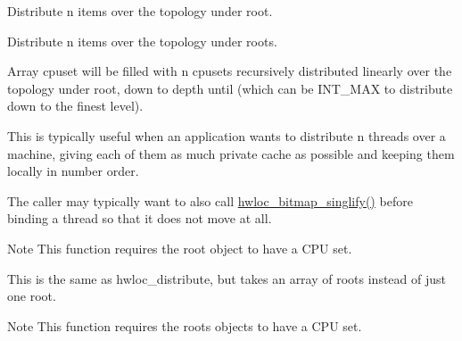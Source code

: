Distribute {\ttfamily n} items over the topology under {\ttfamily root}. 

Distribute {\ttfamily n} items over the topology under {\ttfamily roots}.

Array {\ttfamily cpuset} will be filled with {\ttfamily n} cpusets recursively distributed linearly over the topology under {\ttfamily root}, down to depth {\ttfamily until} (which can be INT\_\-MAX to distribute down to the finest level).

This is typically useful when an application wants to distribute {\ttfamily n} threads over a machine, giving each of them as much private cache as possible and keeping them locally in number order.

The caller may typically want to also call \hyperlink{a00065_ga4630aa1b7e08eac5b41be126194e84a1}{hwloc\_\-bitmap\_\-singlify()} before binding a thread so that it does not move at all.

\begin{DoxyNote}{Note}
This function requires the {\ttfamily root} object to have a CPU set.
\end{DoxyNote}
This is the same as hwloc\_\-distribute, but takes an array of roots instead of just one root.

\begin{DoxyNote}{Note}
This function requires the {\ttfamily roots} objects to have a CPU set. 
\end{DoxyNote}
